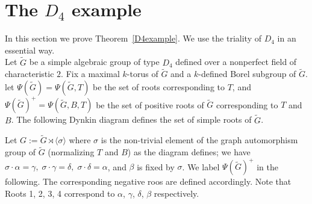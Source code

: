 \section{The $D_4$ example}
In this section we prove Theorem~\ref{D4example}. We use the triality of $D_4$ in an essential way.\\

Let $\tilde{G}$ be a simple algebraic group of type $D_4$ defined over a nonperfect field of characteristic $2$. Fix a maximal $k$-torus of $\tilde{G}$ and a $k$-defined Borel subgroup of $\tilde{G}$. let $\Psi(\tilde G)=\Psi(\tilde G,T)$ be the set of roots corresponding to $T$, and $\Psi(\tilde{G})^{+}=\Psi(\tilde{G},B,T)$ be the set of positive roots of $\tilde{G}$ corresponding to $T$ and $B$. The following Dynkin diagram defines the set of simple roots of $\tilde{G}$.
\begin{figure}[h]
                \centering
\end{figure}
Let $G:=\tilde{G}\rtimes \langle \sigma \rangle$ where $\sigma$ is the non-trivial element of the graph automorphism group of $\tilde{G}$ (normalizing $T$ and $B$) as the diagram defines; we have $\sigma\cdot \alpha=\gamma, \; \sigma\cdot \gamma=\delta, \; \sigma\cdot \delta=\alpha$, and $\beta$ is fixed by $\sigma$. We label $\Psi(\tilde{G})^{+}$ in the following. The corresponding negative roos are defined accordingly. Note that Roots 1, 2, 3, 4 correspond to $\alpha$, $\gamma$, $\delta$, $\beta$ respectively.

\begin{table}[!h]
\begin{center}
\end{center}
\end{table}   

